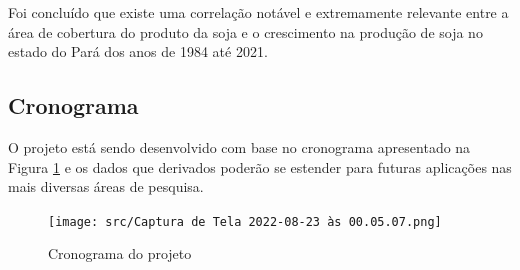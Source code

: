 Foi concluído que existe uma correlação notável e extremamente relevante entre a área de cobertura do produto da soja e o crescimento na produção de soja no estado do Pará dos anos de 1984 até 2021.

\subsection{Cronograma}

O projeto está sendo desenvolvido com base no cronograma apresentado na Figura \ref{fig:crono} e os dados que derivados poderão se estender para futuras aplicações nas mais diversas áreas de pesquisa. 

\begin{figure}[hbt!]
    \centering
    \texttt{[image: src/Captura de Tela 2022-08-23 às 00.05.07.png]}
    \caption{Cronograma do projeto}
    \label{fig:crono}
\end{figure}

